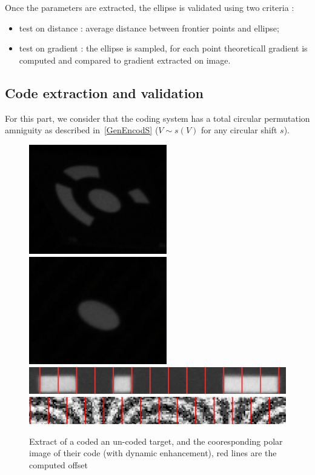 Once the parameters are extracted, the ellipse is validated using two criteria :

\begin{itemize}
	\item  test on distance : average distance between frontier points and
		ellipse;

	\item  test on gradient : the ellipse is sampled, for each point theoreticall
		gradient is computed and compared to gradient extracted on image.
\end{itemize}


\subsection{Code extraction and validation}

For this part, we consider that the coding system has a total circular permutation
amniguity as described in~\ref{GenEncodS} ($V \sim s(V)$ for any circular shift $s$).

\begin{figure}
\centering
	\includegraphics[width=6cm]{Methods/Images/ZoomElCoded.jpg}
	\includegraphics[width=6cm]{Methods/Images/ZoomElUnCoded.jpg}
	\includegraphics[width=12cm]{Methods/Images/Polar2.jpg}
	\includegraphics[width=12cm]{Methods/Images/Polar1.jpg}
	\caption{Extract of a coded an un-coded target, and the cooresponding polar image of their code
	(with dynamic enhancement), red lines are the computed offset}
\label{fig:CodeT:Ellipse}
\end{figure}


